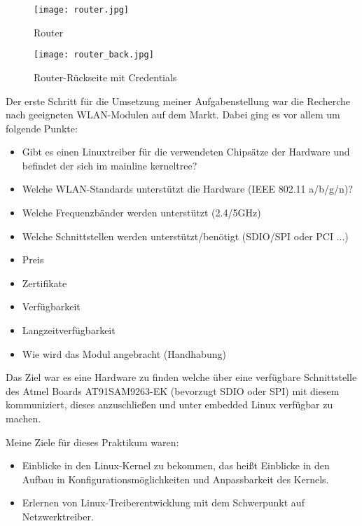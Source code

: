 \documentclass[pdftex,12pt,a4paper]{scrartcl}
\begin{document}
\begin{figure}[H] %
    \centering
    \texttt{[image: router.jpg]}
    \caption{Router}
\end{figure}
\begin{figure}[H] %
    \centering
    \texttt{[image: router\_back.jpg]}
    \caption{Router-Rückseite mit Credentials}
\end{figure}
Der erste Schritt für die Umsetzung meiner Aufgabenstellung war die Recherche nach geeigneten WLAN-Modulen auf dem Markt.
Dabei ging es vor allem um folgende Punkte:\\
\begin{itemize}
 \item Gibt es einen Linuxtreiber für die verwendeten Chipsätze der Hardware und befindet der sich im mainline kerneltree?
 \item Welche WLAN-Standards unterstützt die Hardware (IEEE 802.11 a/b/g/n)?
 \item Welche Frequenzbänder werden unterstützt (2.4/5GHz)
 \item Welche Schnittstellen werden unterstützt/benötigt (SDIO/SPI oder PCI ...)
 \item Preis
 \item Zertifikate
 \item Verfügbarkeit
 \item Langzeitverfügbarkeit
 \item Wie wird das Modul angebracht (Handhabung)
\end{itemize}

Das Ziel war es eine Hardware zu finden welche über eine verfügbare Schnittstelle des Atmel Boards AT91SAM9263-EK (bevorzugt SDIO oder SPI) mit diesem kommuniziert, dieses anzuschließen und unter embedded Linux verfügbar zu machen.

Meine Ziele für dieses Praktikum waren:
\begin{itemize}
 \item Einblicke in den Linux-Kernel zu bekommen, das heißt Einblicke in den Aufbau in Konfigurationsmöglichkeiten und Anpassbarkeit des Kernels.
 \item Erlernen von Linux-Treiberentwicklung mit dem Schwerpunkt auf Netzwerktreiber.
\end{itemize}
\end{document}
